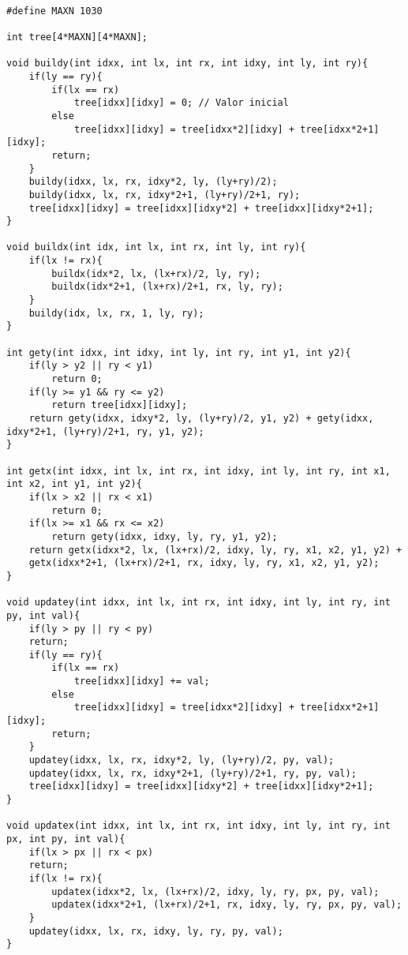 \begin{multicols}{2}
	\begin{lstlisting}

#define MAXN 1030

int tree[4*MAXN][4*MAXN];

void buildy(int idxx, int lx, int rx, int idxy, int ly, int ry){
	if(ly == ry){
		if(lx == rx)
			tree[idxx][idxy] = 0; // Valor inicial
		else
			tree[idxx][idxy] = tree[idxx*2][idxy] + tree[idxx*2+1][idxy];
		return;
	}
	buildy(idxx, lx, rx, idxy*2, ly, (ly+ry)/2);
	buildy(idxx, lx, rx, idxy*2+1, (ly+ry)/2+1, ry);
	tree[idxx][idxy] = tree[idxx][idxy*2] + tree[idxx][idxy*2+1];
}

void buildx(int idx, int lx, int rx, int ly, int ry){
	if(lx != rx){
		buildx(idx*2, lx, (lx+rx)/2, ly, ry);
		buildx(idx*2+1, (lx+rx)/2+1, rx, ly, ry);
	}
	buildy(idx, lx, rx, 1, ly, ry);
}

int gety(int idxx, int idxy, int ly, int ry, int y1, int y2){
	if(ly > y2 || ry < y1)
		return 0;
	if(ly >= y1 && ry <= y2)
		return tree[idxx][idxy];
	return gety(idxx, idxy*2, ly, (ly+ry)/2, y1, y2) + gety(idxx, idxy*2+1, (ly+ry)/2+1, ry, y1, y2);
}

int getx(int idxx, int lx, int rx, int idxy, int ly, int ry, int x1, int x2, int y1, int y2){
	if(lx > x2 || rx < x1)
		return 0;
	if(lx >= x1 && rx <= x2)
		return gety(idxx, idxy, ly, ry, y1, y2);
	return getx(idxx*2, lx, (lx+rx)/2, idxy, ly, ry, x1, x2, y1, y2) +
	getx(idxx*2+1, (lx+rx)/2+1, rx, idxy, ly, ry, x1, x2, y1, y2);
}

void updatey(int idxx, int lx, int rx, int idxy, int ly, int ry, int py, int val){
	if(ly > py || ry < py)
	return;
	if(ly == ry){
		if(lx == rx)
			tree[idxx][idxy] += val;
		else
			tree[idxx][idxy] = tree[idxx*2][idxy] + tree[idxx*2+1][idxy];
		return;
	}
	updatey(idxx, lx, rx, idxy*2, ly, (ly+ry)/2, py, val);
	updatey(idxx, lx, rx, idxy*2+1, (ly+ry)/2+1, ry, py, val);
	tree[idxx][idxy] = tree[idxx][idxy*2] + tree[idxx][idxy*2+1];
}

void updatex(int idxx, int lx, int rx, int idxy, int ly, int ry, int px, int py, int val){
	if(lx > px || rx < px)
	return;
	if(lx != rx){
		updatex(idxx*2, lx, (lx+rx)/2, idxy, ly, ry, px, py, val);
		updatex(idxx*2+1, (lx+rx)/2+1, rx, idxy, ly, ry, px, py, val);
	}
	updatey(idxx, lx, rx, idxy, ly, ry, py, val);
}

	\end{lstlisting}
\end{multicols}

